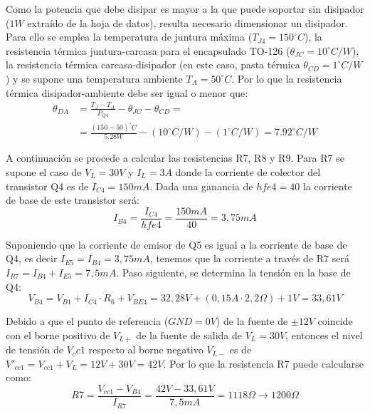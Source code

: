 Como la potencia que debe disipar es mayor a la que puede soportar sin disipador ($1 W$ extraído de la hoja de datos), resulta necesario dimensionar un disipador. Para ello se emplea la temperatura de juntura máxima ($T_{J4}=150^\circ C$), la resistencia térmica juntura-carcasa para el encapsulado TO-126 ($\theta _{JC}=10^\circ C/W$), la resistencia térmica carcasa-disipador (en este caso, pasta térmica $\theta _{CD}=1^\circ C/W$) y se supone una temperatura ambiente $T_A=50^\circ C$. Por lo que la resistencia térmica disipador-ambiente debe ser igual o menor que:
\begin{equation}
\begin{split}
\theta_{DA} &= \frac{T_J-T_A}{P_{Q4}}-\theta_{JC}-\theta_{CD}=\\
&= \frac{(150-50)^\circ C}{5.28W}-(10^\circ C/W)-(1^\circ C/W)=7.92^\circ C/W
\end{split}
\end{equation} \par
 
A continuación se procede a calcular las resistencias R7, R8 y R9. Para R7 se supone el caso de $V_L=30 V$ y $I_L=3 A$ donde la corriente de colector del transistor Q4 es de $I_{C4}=150 mA$. Dada una ganancia de $hfe4=40$ la corriente de base de este transistor será:
\begin{equation}
I_{B4}=\frac{I_{C4}}{hfe4}=\frac{150mA}{40}=3,75mA
\end{equation}\par

Suponiendo que la corriente de emisor de Q5 es igual a la corriente de base de Q4, es decir $I_{E5}=I_{B4}=3,75mA$, tenemos que la corriente a través de R7 será $I_{R7}=I_{B4}+I_{E5}=7,5mA$. Paso siguiente, se determina la tensión en la base de Q4:
\begin{equation}
V_{B4}=V_{B1}+I_{C4}\cdot R_6+V_{BE4}=32,28V+(0,15A\cdot 2,2\Omega)+1V=33,61V
\end{equation}\par

Debido a que el punto de referencia ($GND=0V$) de la fuente de $\pm 12V$ coincide con el borne positivo de $V_{L+}$ de la fuente de salida de $V_L=30V$, entonces el nivel de tensión de $V_cc1$ respecto al borne negativo $V_{L-}$ es de $V'_{cc1}=V_{cc1}+V_L=12V+30V=42V$. Por lo que la resistencia R7 puede calcularse como:
\begin{equation}
R7=\frac{V_{cc1}-V_{B4}}{I_{R7}}=\frac{42V-33,61V}{7,5 mA}=1118 \Omega \to 1200\Omega
\end{equation}\par 

